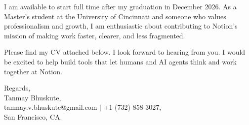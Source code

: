\documentclass[11pt]{letter}
\begin{document}
\begin{letter}{}
I am available to start full time after my graduation in December 2026. As a Master's student at the University of Cincinnati and someone who values professionalism and growth, I am enthusiastic about contributing to Notion's mission of making work faster, clearer, and less fragmented.

Please find my CV attached below. I look forward to hearing from you. I would be excited to help build tools that let humans and AI agents think and work together at Notion.

{\setlength{\parskip}{0pt}
Regards,\\
Tanmay Bhuskute,\\
tanmay.v.bhuskute@gmail.com $\mid$ +1 (732) 858-3027,\\
San Francisco, CA.
}

\end{letter}
\end{document}
